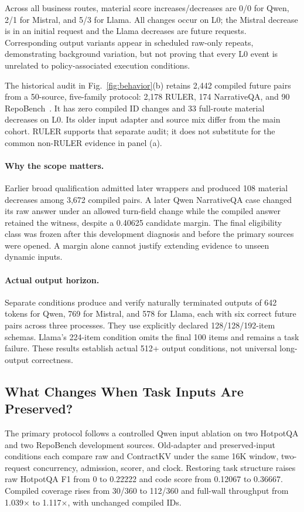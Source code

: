 Across all business routes, material score increases/decreases are 0/0 for Qwen, 2/1 for Mistral, and 5/3 for Llama. All changes occur on L0; the Mistral decrease is in an initial request and the Llama decreases are future requests. Corresponding output variants appear in scheduled raw-only repeats, demonstrating background variation, but not proving that every L0 event is unrelated to policy-associated execution conditions.

The historical audit in Fig.~\ref{fig:behavior}(b) retains 2,442 compiled future pairs from a 50-source, five-family protocol: 2,178 RULER, 174 NarrativeQA, and 90 RepoBench~\cite{ruler2024,narrativeqa2018,qasper2021}. It has zero compiled ID changes and 33 full-route material decreases on L0. Its older input adapter and source mix differ from the main cohort. RULER supports that separate audit; it does not substitute for the common non-RULER evidence in panel (a).

\paragraph{Why the scope matters.}
Earlier broad qualification admitted later wrappers and produced 108 material decreases among 3,672 compiled pairs. A later Qwen NarrativeQA case changed its raw answer under an allowed turn-field change while the compiled answer retained the witness, despite a 0.40625 candidate margin. The final eligibility class was frozen after this development diagnosis and before the primary sources were opened. A margin alone cannot justify extending evidence to unseen dynamic inputs.

\paragraph{Actual output horizon.}
Separate conditions produce and verify naturally terminated outputs of 642 tokens for Qwen, 769 for Mistral, and 578 for Llama, each with six correct future pairs across three processes. They use explicitly declared 128/128/192-item schemas. Llama's 224-item condition omits the final 100 items and remains a task failure. These results establish actual 512+ output conditions, not universal long-output correctness.

\subsection{What Changes When Task Inputs Are Preserved?}
\label{sec:fidelity}
The primary protocol follows a controlled Qwen input ablation on two HotpotQA and two RepoBench development sources. Old-adapter and preserved-input conditions each compare raw and ContractKV under the same 16K window, two-request concurrency, admission, scorer, and clock. Restoring task structure raises raw HotpotQA F1 from 0 to 0.22222 and code score from 0.12067 to 0.36667. Compiled coverage rises from 30/360 to 112/360 and full-wall throughput from 1.039$\times$ to 1.117$\times$, with unchanged compiled IDs.

